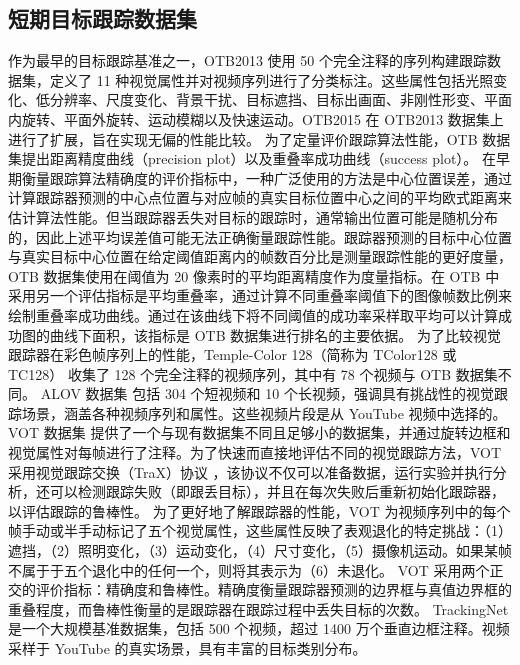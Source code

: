 \subsection{短期目标跟踪数据集}
作为最早的目标跟踪基准之一，OTB2013 \cite{OTB} 使用 50 个完全注释的序列构建跟踪数据集，定义了 11 种视觉属性并对视频序列进行了分类标注。这些属性包括光照变化、低分辨率、尺度变化、背景干扰、目标遮挡、目标出画面、非刚性形变、平面内旋转、平面外旋转、运动模糊以及快速运动。OTB2015 \cite{OTB2015} 在 OTB2013 数据集上进行了扩展，旨在实现无偏的性能比较。
为了定量评价跟踪算法性能，OTB 数据集提出距离精度曲线（precision plot）以及重叠率成功曲线（success plot）。
在早期衡量跟踪算法精确度的评价指标中，一种广泛使用的方法是中心位置误差，通过计算跟踪器预测的中心点位置与对应帧的真实目标位置中心之间的平均欧式距离来估计算法性能。但当跟踪器丢失对目标的跟踪时，通常输出位置可能是随机分布的，因此上述平均误差值可能无法正确衡量跟踪性能。跟踪器预测的目标中心位置与真实目标中心位置在给定阈值距离内的帧数百分比是测量跟踪性能的更好度量，OTB 数据集使用在阈值为 20 像素时的平均距离精度作为度量指标。在 OTB 中采用另一个评估指标是平均重叠率，通过计算不同重叠率阈值下的图像帧数比例来绘制重叠率成功曲线。通过在该曲线下将不同阈值的成功率采样取平均可以计算成功图的曲线下面积，该指标是 OTB 数据集进行排名的主要依据。
为了比较视觉跟踪器在彩色帧序列上的性能，Temple-Color 128（简称为 TColor128 或 TC128）\cite{TC128} 收集了 128 个完全注释的视频序列，其中有 78 个视频与 OTB 数据集不同。
ALOV 数据集 \cite{ALOV} 包括 304 个短视频和 10 个长视频，强调具有挑战性的视觉跟踪场景，涵盖各种视频序列和属性。这些视频片段是从 YouTube 视频中选择的。
VOT 数据集 \cite{VOT2015} 提供了一个与现有数据集不同且足够小的数据集，并通过旋转边框和视觉属性对每帧进行了注释。为了快速而直接地评估不同的视觉跟踪方法，VOT 采用视觉跟踪交换（TraX）协议 \cite{TraX}，该协议不仅可以准备数据，运行实验并执行分析，还可以检测跟踪失败（即跟丢目标），并且在每次失败后重新初始化跟踪器，以评估跟踪的鲁棒性。
为了更好地了解跟踪器的性能，VOT 为视频序列中的每个帧手动或半手动标记了五个视觉属性，这些属性反映了表观退化的特定挑战：（1）遮挡，（2）照明变化，（3）运动变化，（4）尺寸变化，（5）摄像机运动。如果某帧不属于于五个退化中的任何一个，则将其表示为（6）未退化。
VOT 采用两个正交的评价指标：精确度和鲁棒性。精确度衡量跟踪器预测的边界框与真值边界框的重叠程度，而鲁棒性衡量的是跟踪器在跟踪过程中丢失目标的次数。
TrackingNet \cite{muller2018trackingnet} 是一个大规模基准数据集，包括 500 个视频，超过 1400 万个垂直边框注释。视频采样于 YouTube 的真实场景，具有丰富的目标类别分布。

